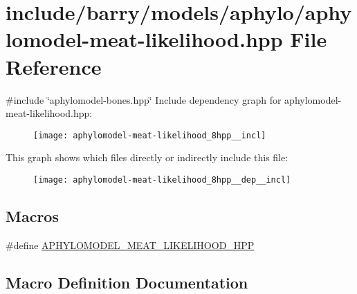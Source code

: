 \hypertarget{aphylomodel-meat-likelihood_8hpp}{}\section{include/barry/models/aphylo/aphylomodel-\/meat-\/likelihood.hpp File Reference}
\label{aphylomodel-meat-likelihood_8hpp}
{\ttfamily \#include \char`\"{}aphylomodel-\/bones.\+hpp\char`\"{}}\newline
Include dependency graph for aphylomodel-\/meat-\/likelihood.hpp\+:\nopagebreak
\begin{figure}[H]
\begin{center}
\leavevmode
\texttt{[image: aphylomodel-meat-likelihood\_8hpp\_\_incl]}
\end{center}
\end{figure}
This graph shows which files directly or indirectly include this file\+:\nopagebreak
\begin{figure}[H]
\begin{center}
\leavevmode
\texttt{[image: aphylomodel-meat-likelihood\_8hpp\_\_dep\_\_incl]}
\end{center}
\end{figure}
\subsection*{Macros}
\begin{DoxyCompactItemize}
\item 
\#define \hyperlink{aphylomodel-meat-likelihood_8hpp_a83a4fa16961bc530771c7bf9441fd32b}{A\+P\+H\+Y\+L\+O\+M\+O\+D\+E\+L\+\_\+\+M\+E\+A\+T\+\_\+\+L\+I\+K\+E\+L\+I\+H\+O\+O\+D\+\_\+\+H\+PP}
\end{DoxyCompactItemize}


\subsection{Macro Definition Documentation}
\mbox{\label{aphylomodel-meat-likelihood_8hpp_a83a4fa16961bc530771c7bf9441fd32b}} 
